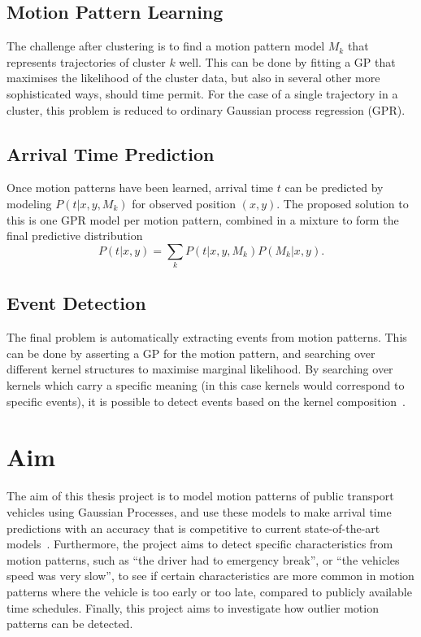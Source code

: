 \subsection{Motion Pattern Learning}
The challenge after clustering is to find a motion
pattern model $M_k$ that represents trajectories of cluster $k$ well. 
This can be done by fitting a GP
that maximises the likelihood of the cluster data, but also in several
other more sophisticated ways, should time permit. For the case of a single trajectory in
a cluster, this problem is reduced to ordinary Gaussian
process regression (GPR).

\subsection{Arrival Time Prediction}
Once motion patterns have been learned, arrival time $t$ can be predicted
by modeling $P(t | x, y, M_k)$ for observed position $(x, y)$. The proposed solution to this is one GPR
model per motion pattern, combined in a mixture to form the final
predictive distribution
\[P(t | x, y) = \sum_{k} P(t | x, y, M_k)P(M_k | x, y).\]

\subsection{Event Detection}
The final problem is automatically extracting events from motion
patterns. This can be done by asserting a GP for the motion pattern,
and searching over different kernel structures to maximise marginal
likelihood. By searching over kernels which carry a specific meaning (in this case
kernels would correspond to specific events), it is possible to
detect events based on the kernel composition~\cite{duvenaud2013structure}.

\section{Aim}
\label{sec:aim}
The aim of this thesis project is to model motion patterns of public
transport vehicles using Gaussian Processes, and use these
models to make arrival time predictions with an accuracy that is
competitive to current state-of-the-art models~\cite{Sinn2012Sep,
  Gurmu2014, pang2018learning}. Furthermore, the project aims to
detect specific characteristics from motion patterns, such as ``the
driver had to emergency break'', or ``the vehicles speed was very slow'', to see if certain characteristics
are more common in motion patterns where the vehicle is too early or
too late, compared to publicly available time schedules. Finally, this
project aims to investigate how outlier motion patterns can be
detected.

